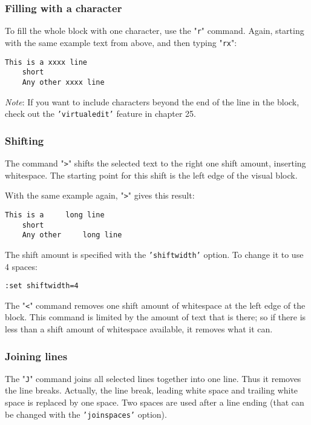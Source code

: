 {\subsubsection{Filling with a character}
To fill the whole block with one character, use the "\texttt{r}" command.
Again, starting with the same example text from above, and then typing "\texttt{rx}":

\begin{Verbatim}[samepage=true]
    This is a xxxx line 
    short 
    Any other xxxx line 
\end{Verbatim}

\emph{Note}:
If you want to include characters beyond the end of the line in the block, check out the \texttt{'virtualedit'} feature in chapter 25.

\subsubsection{Shifting}
The command "\texttt{>}" shifts the selected text to the right one shift amount, inserting whitespace.
The starting point for this shift is the left edge of the visual block.

With the same example again, "\texttt{>}" gives this result:

\begin{Verbatim}[samepage=true]
    This is a     long line 
    short 
    Any other     long line 
\end{Verbatim}

The shift amount is specified with the \texttt{'shiftwidth'} option.
To change it to use 4 spaces:

\begin{Verbatim}[samepage=true]
 :set shiftwidth=4
\end{Verbatim}

The "\texttt{<}" command removes one shift amount of whitespace at the left edge of the block.
This command is limited by the amount of text that is there; so if there is less than a shift amount of whitespace available, it removes what it can.


\subsubsection{Joining lines}
The "\texttt{J}" command joins all selected lines together into one line.
Thus it removes the line breaks.
Actually, the line break, leading white space and trailing white space is replaced by one space.
Two spaces are used after a line ending (that can be changed with the \texttt{'joinspaces'} option).

}
